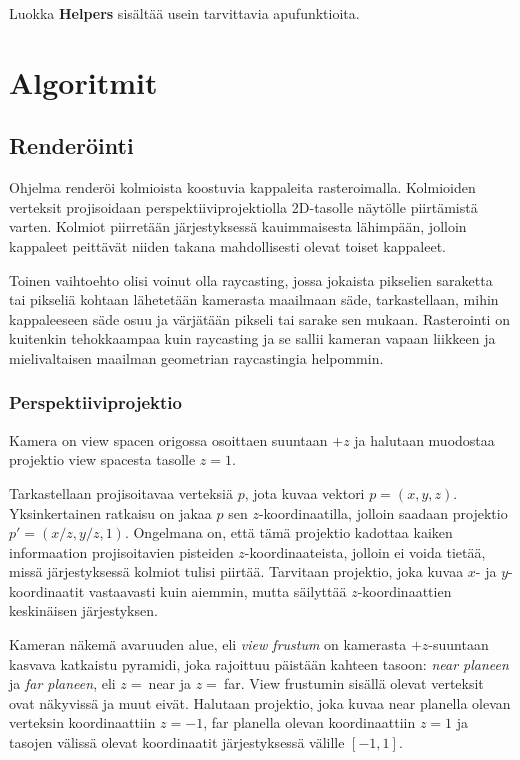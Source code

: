 \documentclass[12pt] {article}
\begin{document}
Luokka \textbf{Helpers} sisältää usein tarvittavia apufunktioita.

\section {Algoritmit}

\subsection {Renderöinti}

Ohjelma renderöi kolmioista koostuvia kappaleita rasteroimalla. Kolmioiden verteksit projisoidaan perspektiiviprojektiolla 2D-tasolle näytölle piirtämistä varten. Kolmiot piirretään järjestyksessä kauimmaisesta lähimpään, jolloin kappaleet peittävät niiden takana mahdollisesti olevat toiset kappaleet.

Toinen vaihtoehto olisi voinut olla raycasting, jossa jokaista pikselien saraketta tai pikseliä kohtaan lähetetään kamerasta maailmaan säde, tarkastellaan, mihin kappaleeseen säde osuu ja värjätään pikseli tai sarake sen mukaan. Rasterointi on kuitenkin tehokkaampaa kuin raycasting ja se sallii kameran vapaan liikkeen ja mielivaltaisen maailman geometrian raycastingia helpommin.

\subsubsection {Perspektiiviprojektio}

Kamera on view spacen origossa osoittaen suuntaan $+z$ ja halutaan muodostaa projektio view spacesta tasolle $z = 1$. 

Tarkastellaan projisoitavaa verteksiä $p$, jota kuvaa vektori $p = (x, y, z)$. Yksinkertainen ratkaisu on jakaa $p$ sen $z$-koordinaatilla, jolloin saadaan projektio $p' = (x/z, y/z, 1)$. Ongelmana on, että tämä projektio kadottaa kaiken informaation projisoitavien pisteiden $z$-koordinaateista, jolloin ei voida tietää, missä järjestyksessä kolmiot tulisi piirtää. Tarvitaan projektio, joka kuvaa $x$- ja $y$-koordinaatit vastaavasti kuin aiemmin, mutta säilyttää $z$-koordinaattien keskinäisen järjestyksen.

Kameran näkemä avaruuden alue, eli \textit{view frustum} on kamerasta $+z$-suuntaan kasvava katkaistu pyramidi, joka rajoittuu päistään kahteen tasoon: \textit{near planeen} ja \textit{far planeen}, eli $z =\ $near ja $z =\ $far. View frustumin sisällä olevat verteksit ovat näkyvissä ja muut eivät. Halutaan projektio, joka kuvaa near planella olevan verteksin koordinaattiin $z = -1$, far planella olevan koordinaattiin $z = 1$ ja tasojen välissä olevat koordinaatit järjestyksessä välille $[-1, 1]$.
\end{document}
